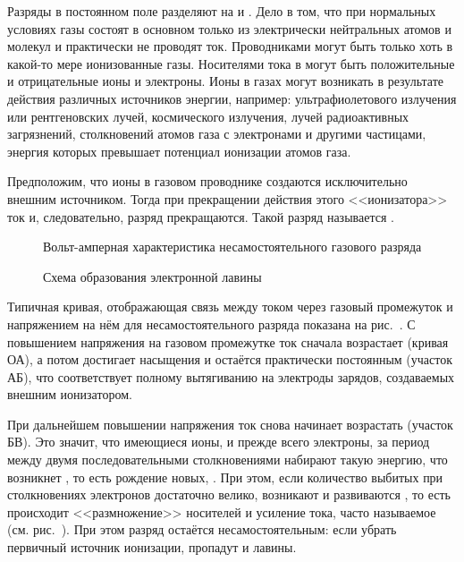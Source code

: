 Разряды в постоянном поле разделяют на  и
. Дело в том, что при нормальных
условиях газы состоят в основном только из электрически нейтральных атомов и
молекул и практически не проводят ток.
Проводниками могут быть только хоть в какой-то мере ионизованные газы.
Носителями тока в могут быть положительные и отрицательные ионы и электроны.
Ионы в газах могут возникать в результате действия различных
источников энергии, например: ультрафиолетового излучения или рентгеновских лучей,
космического излучения, лучей радиоактивных загрязнений,
столкновений атомов газа с электронами и другими частицами, энергия
которых превышает потенциал ионизации атомов газа.

Предположим, что ионы в газовом проводнике создаются исключительно внешним
источником. Тогда при прекращении действия этого <<ионизатора>> ток и,
следовательно, разряд прекращаются. Такой разряд называется
.

\begin{figure}[h]
    \centering
    \caption{Вольт-амперная характеристика несамостоятельного газового разряда}
\end{figure}

\begin{wrapfigure}{o}{0.36\textwidth}
    \centering
    \caption{Схема образования электронной лавины}
\end{wrapfigure}

Типичная кривая, отображающая связь между током через газовый промежуток и
напряжением на нём для несамостоятельного разряда показана на
рис.~. С повышением напряжения
на газовом промежутке ток сначала возрастает (кривая ОА), а потом достигает
насыщения и остаётся практически постоянным (участок АБ), что соответствует
полному вытягиванию на электроды зарядов, создаваемых внешним ионизатором.

При дальнейшем повышении напряжения ток снова начинает возрастать (участок БВ).
Это значит, что имеющиеся ионы, и прежде всего электроны, за период между двумя
последовательными столкновениями набирают такую энергию, что возникнет
, то есть рождение новых,
. При этом,
если количество выбитых при столкновениях электронов достаточно велико,
возникают и развиваются ,
то есть происходит <<размножение>> носителей и усиление тока,
часто называемое  (см. рис.~).
При этом разряд остаётся несамостоятельным: если убрать первичный источник
ионизации, пропадут и лавины.

